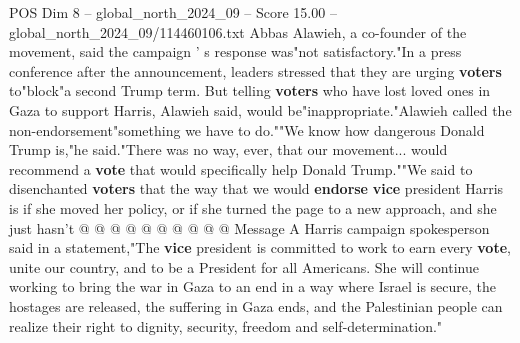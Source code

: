 \begin{textsample}{POS Dim 8 – global\_north\_2024\_09 – Score 15.00 – global\_north\_2024\_09/114460106.txt}
Abbas Alawieh, a co-founder of the movement, said the campaign ' s response was"not satisfactory."In a press conference after the announcement, leaders stressed that they are urging \textbf{voters} to"block"a second Trump term.
But telling \textbf{voters} who have lost loved ones in Gaza to support Harris, Alawieh said, would be"inappropriate."Alawieh called the non-endorsement"something we have to do.""We know how dangerous Donald Trump is,"he said."There was no way, ever, that our movement... would recommend a \textbf{vote} that would specifically help Donald Trump.""We said to disenchanted \textbf{voters} that the way that we would \textbf{endorse} \textbf{vice} president Harris is if she moved her policy, or if she turned the page to a new approach, and she just hasn't @ @ @ @ @ @ @ @ @ @ Message A Harris campaign spokesperson said in a statement,"The \textbf{vice} president is committed to work to earn every \textbf{vote}, unite our country, and to be a President for all Americans.
She will continue working to bring the war in Gaza to an end in a way where Israel is secure, the hostages are released, the suffering in Gaza ends, and the Palestinian people can realize their right to dignity, security, freedom and self-determination."

\end{textsample}
